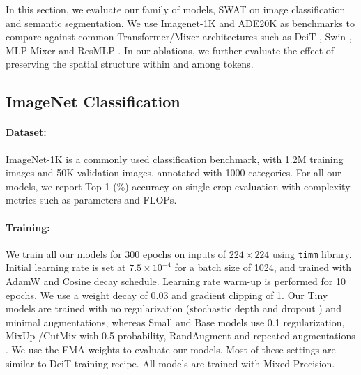 \documentclass[10pt,twocolumn,letterpaper]{article}
\begin{document}
In this section, we evaluate our family of models, SWAT on image classification and semantic segmentation. We use Imagenet-1K \cite{deng2009imagenet} and ADE20K \cite{zhou2019ade20k} as benchmarks to compare against common Transformer/Mixer architectures such as DeiT \cite{touvron2021deit}, Swin \cite{liu2021swin}, MLP-Mixer \cite{tolstikhin2021mixer} and ResMLP \cite{touvron2021resmlp}. In our ablations, we further evaluate the effect of preserving the spatial structure within and among tokens.


\subsection{ImageNet Classification}
\label{subsec:charades}

\paragraph{Dataset:} ImageNet-1K \cite{deng2009imagenet} is a commonly used classification benchmark, with 1.2M training images and 50K validation images, annotated with 1000 categories. For all our models, we report Top-1 (\%) accuracy on single-crop evaluation with complexity metrics such as parameters and FLOPs. %

\paragraph{Training:} We train all our models for 300 epochs on inputs of $224\times224$ using \texttt{timm} \cite{rw2019timm} library. Initial learning rate is set at $7.5\times10^{-4}$ for a batch size of 1024, and trained with AdamW \cite{kingma15adam} and Cosine decay schedule. Learning rate warm-up is performed for 10 epochs. We use a weight decay \cite{loshchilov2017decoupled} of 0.03 and gradient clipping of 1. Our Tiny models are trained with no regularization (stochastic depth \cite{huang2016deep} and dropout \cite{srivastava2014dropout}) and minimal augmentations, whereas Small and Base models use 0.1 regularization, MixUp \cite{zhang2017mixup}/CutMix \cite{yun2019cutmix} with 0.5 probability, RandAugment \cite{cubuk2020randaugment} and repeated augmentations \cite{hoffer2020augment}. We use the EMA \cite{polyak1992acceleration} weights to evaluate our models. Most of these settings are similar to DeiT \cite{touvron2021deit} training recipe. All models are trained with Mixed Precision.
\end{document}
